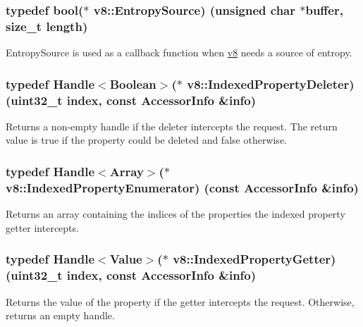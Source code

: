 \subsubsection[{Entropy\+Source}]{\setlength{\rightskip}{0pt plus 5cm}typedef bool($\ast$ v8\+::\+Entropy\+Source) (unsigned char $\ast$buffer, size\+\_\+t length)}\label{namespacev8_ab699f4bbbb56350e6e915682e420fcdc}
Entropy\+Source is used as a callback function when \hyperlink{namespacev8}{v8} needs a source of entropy. \hypertarget{namespacev8_a3a7c18d62a0d1f2d12845051920be592}{}
\subsubsection[{Indexed\+Property\+Deleter}]{\setlength{\rightskip}{0pt plus 5cm}typedef {\bf Handle}$<${\bf Boolean}$>$($\ast$ v8\+::\+Indexed\+Property\+Deleter) (uint32\+\_\+t index, const {\bf Accessor\+Info} \&info)}\label{namespacev8_a3a7c18d62a0d1f2d12845051920be592}
Returns a non-\/empty handle if the deleter intercepts the request. The return value is true if the property could be deleted and false otherwise. \hypertarget{namespacev8_a15ab299eff53946ab483b762a4cb20dc}{}
\subsubsection[{Indexed\+Property\+Enumerator}]{\setlength{\rightskip}{0pt plus 5cm}typedef {\bf Handle}$<${\bf Array}$>$($\ast$ v8\+::\+Indexed\+Property\+Enumerator) (const {\bf Accessor\+Info} \&info)}\label{namespacev8_a15ab299eff53946ab483b762a4cb20dc}
Returns an array containing the indices of the properties the indexed property getter intercepts. \hypertarget{namespacev8_abf3be19b5157493da3859987cc50c6ab}{}
\subsubsection[{Indexed\+Property\+Getter}]{\setlength{\rightskip}{0pt plus 5cm}typedef {\bf Handle}$<${\bf Value}$>$($\ast$ v8\+::\+Indexed\+Property\+Getter) (uint32\+\_\+t index, const {\bf Accessor\+Info} \&info)}\label{namespacev8_abf3be19b5157493da3859987cc50c6ab}
Returns the value of the property if the getter intercepts the request. Otherwise, returns an empty handle. \hypertarget{namespacev8_ac84ffd0beb05009f30378ef45a065edf}{}
